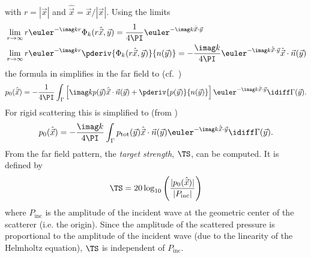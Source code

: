 with $r = |\vec{x}|$ and $\hat{\vec{x}} = \vec{x}/|\vec{x}|$. Using the limits
\begin{equation}\label{Eq4:Phi_k_limits}
\begin{aligned}
	&\lim_{r\to\infty} r\euler^{-\imag k r}\Phi_k(r\hat{\vec{x}},\vec{y}) = \frac{1}{4\PI}\euler^{-\imag k \hat{\vec{x}}\cdot\vec{y}}\\
	&\lim_{r\to\infty} r\euler^{-\imag k r}\pderiv{\Phi_k(r\hat{\vec{x}},\vec{y})}{n(\vec{y})} = -\frac{\imag k}{4\PI}\euler^{-\imag k \hat{\vec{x}}\cdot\vec{y}}\hat{\vec{x}}\cdot\vec{n}(\vec{y})
\end{aligned}	
\end{equation}
the formula in  simplifies in the far field to (cf.~\cite[p. 32]{Ihlenburg1998fea})
\begin{equation}\label{Eq4:KirchhoffIntegralFarField}
	p_0(\hat{\vec{x}}) = -\frac{1}{4\PI}\int_{\Gamma}\left[ \imag k p(\vec{y})\hat{\vec{x}}\cdot\vec{n}(\vec{y}) + \pderiv{p(\vec{y})}{n(\vec{y})}\right]\euler^{-\imag k \hat{\vec{x}}\cdot\vec{y}}\idiff \Gamma(\vec{y}).
\end{equation}
For rigid scattering this is simplified to (from )
\begin{equation}\label{Eq4:KirchhoffIntegralFarField2}
	p_0(\hat{\vec{x}}) = -\frac{\imag k}{4\PI}\int_{\Gamma} p_{\mathrm{tot}}(\vec{y})\hat{\vec{x}}\cdot\vec{n}(\vec{y}) \euler^{-\imag k \hat{\vec{x}}\cdot\vec{y}}\idiff \Gamma(\vec{y}).
\end{equation}
From the far field pattern, the \textit{target strength}, $\TS$, can be computed. It is defined by
\begin{equation}\label{Eq4:TS}
	\TS = 20\log_{10}\left(\frac{|p_0(\hat{\vec{x}})|}{|P_{\mathrm{inc}}|}\right)
\end{equation}
where $P_{\mathrm{inc}}$ is the amplitude of the incident wave at the geometric center of the scatterer (i.e. the origin). Since the amplitude of the scattered pressure is proportional to the amplitude of the incident wave (due to the linearity of the Helmholtz equation), $\TS$ is independent of $P_{\mathrm{inc}}$.

